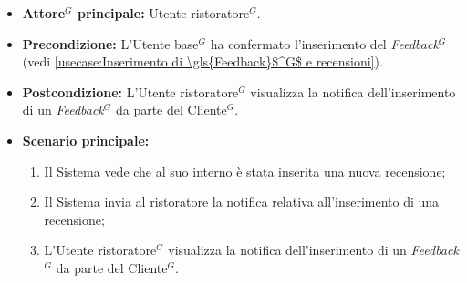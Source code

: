 \label{usecase:Visualizzazione notifica di inserimento \gls{Feedback}$^G$}
\begin{itemize}
	\item \textbf{\gls{Attore}$^G$ principale:} \gls{Utente ristoratore}$^G$.

	\item \textbf{Precondizione:} L'\gls{Utente base}$^G$ ha confermato l'inserimento del \textit{\gls{Feedback}$^G$} (vedi \autoref{usecase:Inserimento di \gls{Feedback}$^G$ e recensioni}).

	\item \textbf{Postcondizione:} L'\gls{Utente ristoratore}$^G$ visualizza la notifica dell'inserimento di un \textit{\gls{Feedback}$^G$} da parte del \gls{Cliente}$^G$.

	\item \textbf{Scenario principale:}
	      \begin{enumerate}
		      \item Il Sistema vede che al suo interno è stata inserita una nuova recensione;
		      \item Il Sistema invia al ristoratore la notifica relativa all'inserimento di una recensione;
		      \item L'\gls{Utente ristoratore}$^G$ visualizza la notifica dell'inserimento di un \textit{\gls{Feedback}$^G$} da parte del \gls{Cliente}$^G$.
	      \end{enumerate}
\end{itemize}
